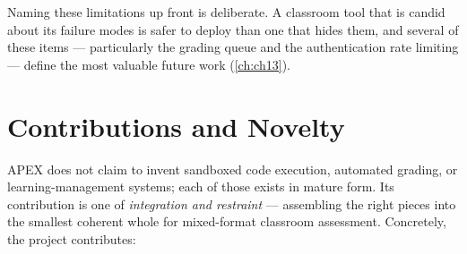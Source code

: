 Naming these limitations up front is deliberate. A classroom tool that is
candid about its failure modes is safer to deploy than one that hides them, and
several of these items --- particularly the grading queue and the
authentication rate limiting --- define the most valuable future work
(\cref{ch:ch13}).

\section{Contributions and Novelty}

APEX does not claim to invent sandboxed code execution, automated grading, or
learning-management systems; each of those exists in mature form. Its
contribution is one of \emph{integration and restraint} --- assembling the
right pieces into the smallest coherent whole for mixed-format classroom
assessment. Concretely, the project contributes:

